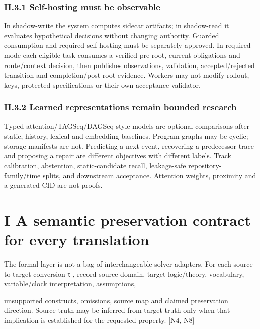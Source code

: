\documentclass{article}
\begin{document}
\subsubsection*{H.3.1 Self-hosting must be observable}
In shadow-write the system computes sidecar artifacts; in shadow-read it evaluates hypothetical
decisions without changing authority. Guarded consumption and required self-hosting must be
separately approved. In required mode each eligible task consumes a verified pre-root, current
obligations and route/context decision, then publishes observations, validation, accepted/rejected
transition and completion/post-root evidence. Workers may not modify rollout, keys, protected
specifications or their own acceptance validator.

\subsubsection*{H.3.2 Learned representations remain bounded research}
Typed-attention/TAGSeq/DAGSeq-style models are optional comparisons after static, history, lexical
and embedding baselines. Program graphs may be cyclic; storage manifests are not. Predicting a next
event, recovering a predecessor trace and proposing a repair are different objectives with different
labels. Track calibration, abstention, static-candidate recall, leakage-safe repository-family/time
splits, and downstream acceptance. Attention weights, proximity and a generated CID are not proofs.

\section*{I A semantic preservation contract for every translation}
The formal layer is not a bag of interchangeable solver adapters. For each source-to-target conversion
τ , record source domain, target logic/theory, vocabulary, variable/clock interpretation, assumptions,


unsupported constructs, omissions, source map and claimed preservation direction. Source truth may
be inferred from target truth only when that implication is established for the requested property. [N4,
N8]
\end{document}
